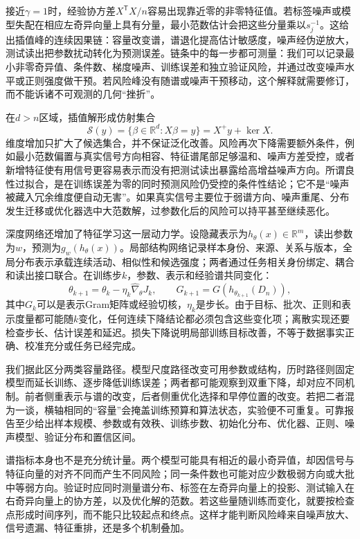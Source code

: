 接近$\gamma=1$时，经验协方差$X^{\mathsf T}X/n$容易出现靠近零的非零特征值。若标签噪声或模型失配在相应左奇异向量上具有分量，最小范数估计会把这些分量乘以$s_j^{-1}$。这给出插值峰的连续因果链：容量改变谱，谱退化提高估计敏感度，噪声经伪逆放大，测试读出把参数扰动转化为预测误差。链条中的每一步都可测量：我们可以记录最小非零奇异值、条件数、梯度噪声、训练误差和独立验证风险，并通过改变噪声水平或正则强度做干预。若风险峰没有随谱或噪声干预移动，这个解释就需要修订，而不能诉诸不可观测的几何“挫折”。

在$d>n$区域，插值解形成仿射集合
\begin{equation}
  \mathcal{S}(y)=\{\beta\in\mathbb{R}^{d}:X\beta=y\}
  =X^+y+\ker X.
\end{equation}
维度增加只扩大了候选集合，并不保证泛化改善。风险再次下降需要额外条件，例如最小范数偏置与真实信号方向相容、特征谱尾部足够温和、噪声方差受控，或者新增特征使有用信号更容易表示而没有把测试读出暴露给高增益噪声方向。所谓良性过拟合，是在训练误差为零的同时预测风险仍受控的条件性结论；它不是“噪声被藏入冗余维度便自动无害”。如果真实信号主要位于弱谱方向、噪声重尾、分布发生迁移或优化器选中大范数解，过参数化后的风险可以持平甚至继续恶化。

深度网络还增加了特征学习这一层动力学。设隐藏表示为$h_{\theta}(x)\in\mathbb{R}^{m}$，读出参数为$w$，预测为$g_w(h_{\theta}(x))$。局部结构网络记录样本身份、来源、关系与版本，全局分布表示承载连续活动、相似性和候选强度；两者通过任务相关身份绑定、耦合和读出接口联合。在训练步$k$，参数、表示和经验谱共同变化：
\begin{equation}
  \theta_{k+1}=\theta_k-\eta_k\widehat\nabla_{\theta}J_k,
  \qquad
  G_{k+1}=G(h_{\theta_{k+1}}(D_n)),
\end{equation}
其中$G_k$可以是表示Gram矩阵或经验切核，$\eta_k$是步长。由于目标、批次、正则和表示度量都可能随$k$变化，任何连续下降结论都必须包含这些变化项；离散实现还要检查步长、估计误差和延迟。损失下降说明局部训练目标改善，不等于数据事实正确、校准充分或任务已经完成。

我们据此区分两类容量路径。模型尺度路径改变可用参数或结构，历时路径则固定模型而延长训练、逐步降低训练误差；两者都可能观察到双重下降，却对应不同机制。前者侧重表示与谱的改变，后者侧重优化选择和早停位置的改变。若把二者混为一谈，横轴相同的“容量”会掩盖训练预算和算法状态，实验便不可重复。可靠报告至少给出样本规模、参数或有效秩、训练步数、初始化分布、优化器、正则、噪声模型、验证分布和置信区间。

谱指标本身也不是充分统计量。两个模型可能具有相近的最小奇异值，却因信号与特征向量的对齐不同而产生不同风险；同一条件数也可能对应少数极弱方向或大批中等弱方向。验证时应同时测量谱分布、标签在左奇异向量上的投影、测试输入在右奇异向量上的协方差，以及优化解的范数。若这些量随训练而变化，就要按检查点形成时间序列，而不能只比较起点和终点。这样才能判断风险峰来自噪声放大、信号遗漏、特征重排，还是多个机制叠加。

